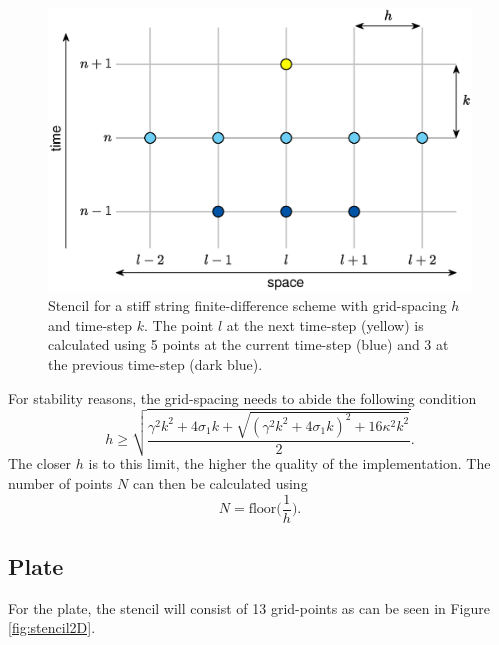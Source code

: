 \documentclass{article}
\begin{document}
\begin{figure}[h]\includegraphics[width=1.0\columnwidth]{stencil1Dedit.eps}
\caption{Stencil for a stiff string finite-difference scheme with grid-spacing $h$ and time-step $k$. The point $l$ at the next time-step (yellow) is calculated using 5 points at the current time-step (blue) and 3 at the previous time-step (dark blue). \label{fig:stencil1D}}
\end{figure}

For stability reasons, the grid-spacing needs to abide the following condition \cite{Bilbao2009:NumericalSoundSynthesis}
\begin{equation}\label{eq:stabilityString}
    h \geq \sqrt{\frac{\gamma^2 k^2 + 4 \sigma_1 k + \sqrt {(\gamma^2 k^2 + 4 \sigma_1 k)^2 + 16 \kappa^2 k^2}}{2}}.
\end{equation}
The closer $h$ is to this limit, the higher the quality of the implementation. The number of points $N$ can then be calculated using 
\begin{equation}
    N = \text{floor}\Bigg(\frac{1}{h}\Bigg).
\end{equation}

\subsection{Plate}
For the plate, the stencil will consist of 13 grid-points as can be seen in Figure \ref{fig:stencil2D}.
\end{document}
